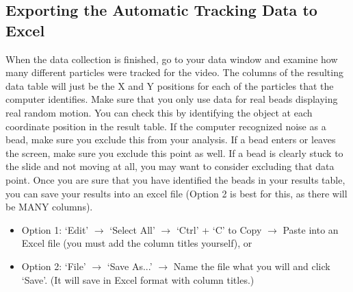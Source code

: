 \subsection*{Exporting the Automatic Tracking Data to Excel}
When the data collection is finished, go to your data window and examine how many different particles were tracked for the video. 
The columns of the resulting data table will just be the X and Y positions for each of the particles that the computer identifies. 
Make sure that you only use data for real beads displaying real random motion. 
You can check this by identifying the object at each coordinate position in the result table. 
If the computer recognized noise as a bead, make sure you exclude this from your analysis. 
If a bead enters or leaves the screen, make sure you exclude this point as well. 
If a bead is clearly stuck to the slide and not moving at all, you may want to consider excluding that data point. 
Once you are sure that you have identified the beads in your results table, you can save your results into an excel file (Option 2 is best for this, as there will be MANY columns).
\begin{itemize}
\item Option 1: `Edit' $\rightarrow$ `Select All' $\rightarrow$ `Ctrl' + `C' to Copy $\rightarrow$ Paste into an Excel file (you must add the column titles yourself), or
\item Option 2: `File' $\rightarrow$ `Save As...' $\rightarrow$ Name the file what you will and click `Save'. (It will save in Excel format with column titles.)
\end{itemize}